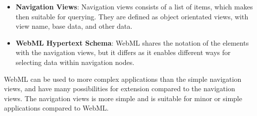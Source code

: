 \begin{itemize}
\item \textbf{Navigation Views}: Navigation views consists of a list of items, which makes then suitable for querying. They are defined as object orientated views, with view name, base data, and other data.
\item \textbf{WebML Hypertext Schema}: WebML shares the notation of the elements with the navigation views, but it differs as it enables different ways for selecting data within navigation nodes.
\end{itemize}

WebML can be used to more complex applications than the simple navigation views, and have many possibilities for extension compared to the navigation views. The navigation views is more simple and is suitable for minor or simple applications compared to WebML.